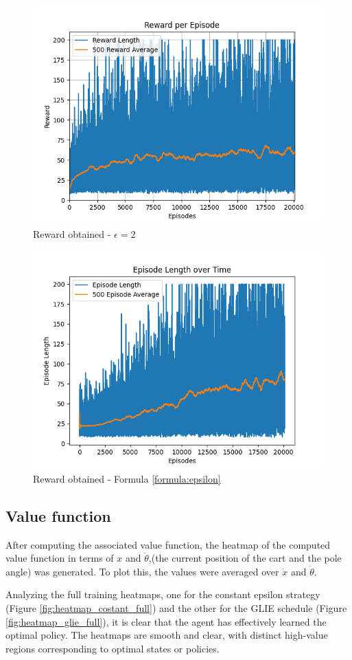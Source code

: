 \documentclass{article}
\begin{document}
\begin{figure}[h]
	\centering
	\includegraphics[width=0.5\linewidth]{../data/plot/q_learning_constant_0.2.png}
	\caption{Reward obtained - $\epsilon = 2$}
	\label{fig:costant_eps}
\end{figure}

\begin{figure}[h]
	\centering
	\includegraphics[width=0.5\linewidth]{../data/plot/q_learning_GLIE.png}
	\caption{Reward obtained - Formula \ref{formula:epsilon}}
	\label{fig:glie_eps}
\end{figure}

\subsection{Value function}
After computing the associated value function, the heatmap of the computed value function in terms of $ x $ and $\dot{\theta}$,(the current position of the cart and the pole angle) was generated. To plot this, the values were averaged over $\dot{x} $ and $\dot{\theta} $.

Analyzing  the full training heatmaps, one for the constant epsilon strategy (Figure  \ref{fig:heatmap_costant_full}) and the other for the GLIE schedule (Figure \ref{fig:heatmap_glie_full}), it is clear that the agent has effectively learned the optimal policy. The heatmaps are smooth and clear, with distinct high-value regions corresponding to optimal states or policies. 
\end{document}
